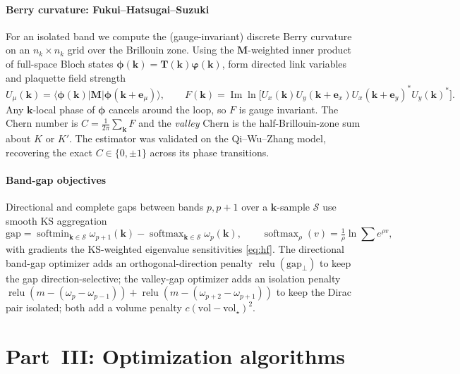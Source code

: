 \documentclass[11pt]{article}
\newcommand{\vM}{\mathbf{M}}
\newcommand{\vT}{\mathbf{T}}
\newcommand{\Imag}{\operatorname{Im}}
\DeclareMathOperator{\softmax}{softmax}
\DeclareMathOperator{\softmin}{softmin}
\DeclareMathOperator{\relu}{relu}
\begin{document}
\subsection{Berry curvature: Fukui--Hatsugai--Suzuki}
For an isolated band we compute the (gauge-invariant) discrete Berry curvature on
an $n_k\times n_k$ grid over the Brillouin zone. Using the $\vM$-weighted inner
product of full-space Bloch states $\bm\phi(\mathbf k)=\vT(\mathbf k)\bm\varphi
(\mathbf k)$, form directed link variables and plaquette field strength
\begin{equation}
  U_\mu(\mathbf k)=\langle\bm\phi(\mathbf k)|\vM|\bm\phi(\mathbf k+\mathbf e_\mu)
  \rangle,\qquad
  F(\mathbf k)=\Imag\ln\!\bigl[U_x(\mathbf k)U_y(\mathbf k{+}\mathbf e_x)
  U_x(\mathbf k{+}\mathbf e_y)^{*}U_y(\mathbf k)^{*}\bigr].
  \label{eq:fhs}
\end{equation}
Any $\mathbf k$-local phase of $\bm\phi$ cancels around the loop, so $F$ is
gauge invariant. The Chern number is $C=\tfrac1{2\pi}\sum_{\mathbf k}F$ and the
\emph{valley} Chern is the half-Brillouin-zone sum about $K$ or $K'$. The
estimator was validated on the Qi--Wu--Zhang model, recovering the exact
$C\in\{0,\pm1\}$ across its phase transitions.

\subsection{Band-gap objectives}
Directional and complete gaps between bands $p,p{+}1$ over a $\mathbf k$-sample
$\mathcal S$ use smooth KS aggregation
\begin{equation}
  \text{gap}=\softmin_{\mathbf k\in\mathcal S}\omega_{p+1}(\mathbf k)
  -\softmax_{\mathbf k\in\mathcal S}\omega_{p}(\mathbf k),\qquad
  \softmax_\rho(v)=\tfrac1\rho\ln\!\sum e^{\rho v},
\end{equation}
with gradients the KS-weighted eigenvalue sensitivities \eqref{eq:hf}. The
directional band-gap optimizer adds an orthogonal-direction penalty
$\relu(\text{gap}_\perp)$ to keep the gap direction-selective; the valley-gap
optimizer adds an isolation penalty $\relu(m-(\omega_p-\omega_{p-1}))+\relu(m-
(\omega_{p+2}-\omega_{p+1}))$ to keep the Dirac pair isolated; both add a volume
penalty $c(\text{vol}-\text{vol}_\star)^2$.

\part*{Part~III: Optimization algorithms}
\end{document}
